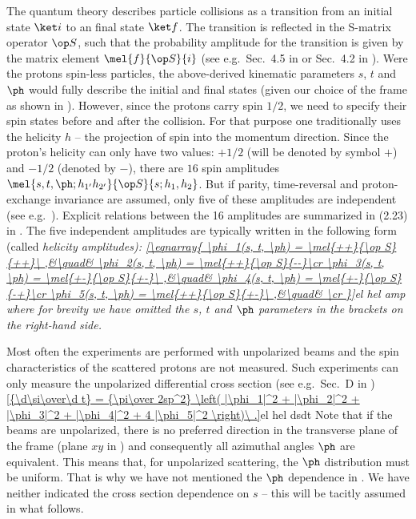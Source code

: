 The quantum theory describes particle collisions as a transition from an initial state $\ket i$ to an final state $\ket f$. The transition is reflected in the S-matrix operator $\op S$, such that the probability amplitude for the transition is given by the matrix element $\mel{f}{\op S}{i}$ (see e.g.~Sec.~4.5 in  or Sec.~4.2 in ). Were the protons spin-less particles, the above-derived kinematic parameters $s$, $t$ and $\ph$ would fully describe the initial and final states (given our choice of the  frame as shown in ). However, since the protons carry spin $1/2$, we need to specify their spin states before and after the collision. For that purpose one traditionally uses the helicity $h$ -- the projection of spin into the momentum direction. Since the proton's helicity can only have two values: $+1/2$ (will be denoted by symbol $+$) and $-1/2$ (denoted by $-$), there are $16$ spin amplitudes $\mel{s, t, \ph; h_{1'} h_{2'}}{\op S}{s; h_1, h_2}$. But if parity, time-reversal and proton-exchange invariance are assumed, only five of these amplitudes are independent (see e.g.~). Explicit relations between the 16 amplitudes are summarized in (2.23) in . The five independent amplitudes are typically written in the following form (called \em{helicity amplitudes}):
\eqref{\eqnarray{
\phi_1(s, t, \ph) = \mel{++}{\op S}{++}\ ,&\quad& \phi_2(s, t, \ph) = \mel{++}{\op S}{--}\cr
\phi_3(s, t, \ph) = \mel{+-}{\op S}{+-}\ ,&\quad& \phi_4(s, t, \ph) = \mel{+-}{\op S}{-+}\cr
\phi_5(s, t, \ph) = \mel{++}{\op S}{+-}\ ,&\quad& \cr
}}{el hel amp}
where for brevity we have omitted the $s$, $t$ and $\ph$ parameters in the brackets on the right-hand side.

Most often the experiments are performed with unpolarized beams and the spin characteristics of the scattered protons are not measured. Such experiments can only measure the unpolarized differential cross section (see e.g.~Sec.~D in )
\eqref{{\d\si\over\d t} = {\pi\over 2sp^2} \left( |\phi_1|^2 + |\phi_2|^2 + |\phi_3|^2 + |\phi_4|^2 + 4 |\phi_5|^2 \right)\ .}{el hel dsdt}
Note that if the beams are unpolarized, there is no preferred direction in the transverse plane of the  frame (plane $xy$ in ) and consequently all azimuthal angles $\ph$ are equivalent. This means that, for unpolarized scattering, the $\ph$ distribution must be uniform. That is why we have not mentioned the $\ph$ dependence in . We have neither indicated the cross section dependence on $s$ -- this will be tacitly assumed in what follows.

